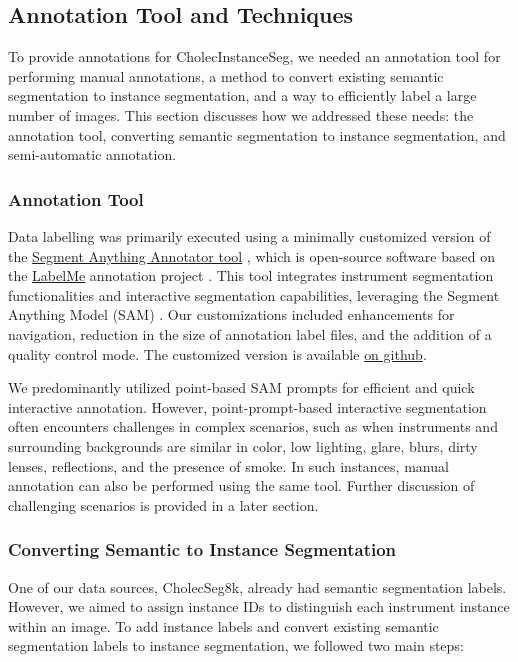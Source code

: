 \subsection{Annotation Tool and Techniques} \label{sec:annotation_methods}
To provide annotations for CholecInstanceSeg, we needed an annotation tool for performing manual annotations, a method to convert existing semantic segmentation to instance segmentation, and a way to efficiently label a large number of images. This section discusses how we addressed these needs: the annotation tool, converting semantic segmentation to instance segmentation, and semi-automatic annotation.

\subsubsection{Annotation Tool}\label{sec:annotation_tool}
Data labelling was primarily executed using a minimally customized version of the \href{https://github.com/haochenheheda/segment-anything-annotator}{Segment Anything Annotator tool} \cite{wangsupplementary}, which is open-source software based on the \href{https://github.com/labelmeai/labelme}{LabelMe} annotation project \cite{wada2016labelme}. This tool integrates instrument segmentation functionalities and interactive segmentation capabilities, leveraging the Segment Anything Model (SAM) \cite{kirillov2023segment}. Our customizations included enhancements for navigation, reduction in the size of annotation label files, and the addition of a quality control mode. The customized version is available \href{https://github.com/labdeeman7/my_samannotator}{on github}.

We predominantly utilized point-based SAM prompts for efficient and quick interactive annotation. However, point-prompt-based interactive segmentation often encounters challenges in complex scenarios, such as when instruments and surrounding backgrounds are similar in color, low lighting, glare, blurs, dirty lenses, reflections, and the presence of smoke. In such instances, manual annotation can also be performed using the same tool. Further discussion of challenging scenarios is provided in a later section.

\subsubsection{Converting Semantic to Instance Segmentation} \label{sec:semantic_to_instance}
One of our data sources, CholecSeg8k, already had semantic segmentation labels. However, we aimed to assign instance IDs to distinguish each instrument instance within an image. To add instance labels and convert existing semantic segmentation labels to instance segmentation, we followed two main steps:

